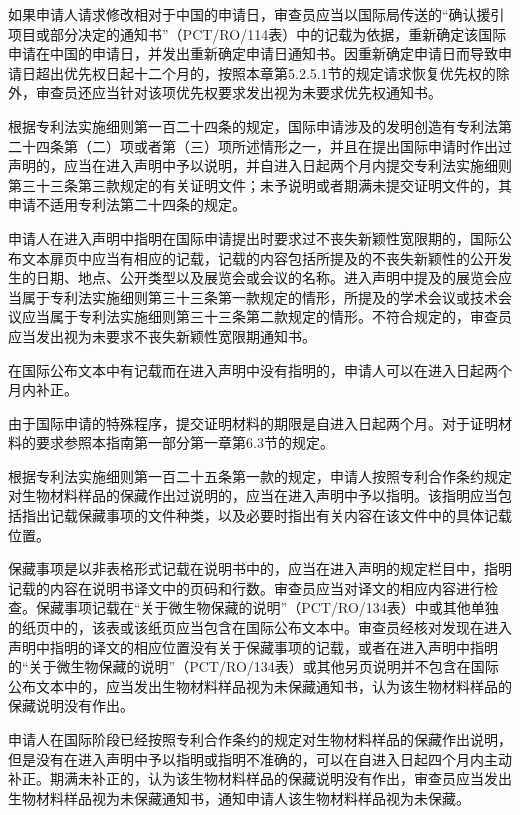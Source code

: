 如果申请人请求修改相对于中国的申请日，审查员应当以国际局传送的“确认援引项目或部分决定的通知书”（PCT/RO/114表）中的记载为依据，重新确定该国际申请在中国的申请日，并发出重新确定申请日通知书。因重新确定申请日而导致申请日超出优先权日起十二个月的，按照本章第5.2.5.1节的规定请求恢复优先权的除外，审查员还应当针对该项优先权要求发出视为未要求优先权通知书。

根据专利法实施细则第一百二十四条的规定，国际申请涉及的发明创造有专利法第二十四条第（二）项或者第（三）项所述情形之一，并且在提出国际申请时作出过声明的，应当在进入声明中予以说明，并自进入日起两个月内提交专利法实施细则第三十三条第三款规定的有关证明文件；未予说明或者期满未提交证明文件的，其申请不适用专利法第二十四条的规定。

申请人在进入声明中指明在国际申请提出时要求过不丧失新颖性宽限期的，国际公布文本扉页中应当有相应的记载，记载的内容包括所提及的不丧失新颖性的公开发生的日期、地点、公开类型以及展览会或会议的名称。进入声明中提及的展览会应当属于专利法实施细则第三十三条第一款规定的情形，所提及的学术会议或技术会议应当属于专利法实施细则第三十三条第二款规定的情形。不符合规定的，审查员应当发出视为未要求不丧失新颖性宽限期通知书。

在国际公布文本中有记载而在进入声明中没有指明的，申请人可以在进入日起两个月内补正。

由于国际申请的特殊程序，提交证明材料的期限是自进入日起两个月。对于证明材料的要求参照本指南第一部分第一章第6.3节的规定。

根据专利法实施细则第一百二十五条第一款的规定，申请人按照专利合作条约规定对生物材料样品的保藏作出过说明的，应当在进入声明中予以指明。该指明应当包括指出记载保藏事项的文件种类，以及必要时指出有关内容在该文件中的具体记载位置。

保藏事项是以非表格形式记载在说明书中的，应当在进入声明的规定栏目中，指明记载的内容在说明书译文中的页码和行数。审查员应当对译文的相应内容进行检查。保藏事项记载在“关于微生物保藏的说明”（PCT/RO/134表）中或其他单独的纸页中的，该表或该纸页应当包含在国际公布文本中。审查员经核对发现在进入声明中指明的译文的相应位置没有关于保藏事项的记载，或者在进入声明中指明的“关于微生物保藏的说明”（PCT/RO/134表）或其他另页说明并不包含在国际公布文本中的，应当发出生物材料样品视为未保藏通知书，认为该生物材料样品的保藏说明没有作出。

申请人在国际阶段已经按照专利合作条约的规定对生物材料样品的保藏作出说明，但是没有在进入声明中予以指明或指明不准确的，可以在自进入日起四个月内主动补正。期满未补正的，认为该生物材料样品的保藏说明没有作出，审查员应当发出生物材料样品视为未保藏通知书，通知申请人该生物材料样品视为未保藏。


